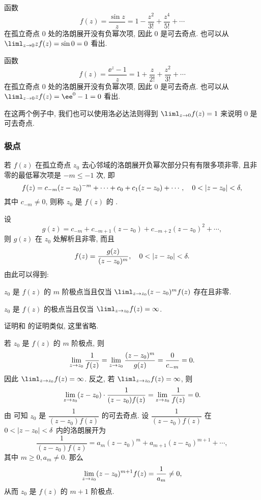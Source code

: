 \begin{exampleenum}
  \item 函数
  \[
    f(z)=\frac{\sin z}z=1-\dfrac{z^2}{3!}+\dfrac{z^4}{5!}+\cdots
  \]
  在孤立奇点 $0$ 处的洛朗展开没有负幂次项, 因此 $0$ 是可去奇点.
  也可以从 $\liml_{z\ra0}zf(z)=\sin 0=0$ 看出.
  \item 函数
  \[
    f(z)=\frac{\ee^z-1}z=1+\dfrac z{2!}+\dfrac{z^2}{3!}+\cdots
  \]
  在孤立奇点 $0$ 处的洛朗展开没有负幂次项, 因此 $0$ 是可去奇点.
  也可以从 $\liml_{z\ra0}zf(z)=\ee^0-1=0$ 看出.
\end{exampleenum}

在这两个例子中, 我们也可以使用洛必达法则得到 $\liml_{z\ra 0}f(z)=1$ 来说明 $0$ 是可去奇点.


\subsubsection{极点}

\begin{definition}
  若 $f(z)$ 在孤立奇点 $z_0$ 去心邻域的洛朗展开负幂次部分只有有限多项非零, 且非零的最低幂次项是 $-m\le-1$ 次, 即
  \[
    f(z)=c_{-m}(z-z_0)^{-m}+\cdots+c_0+c_1(z-z_0)+\cdots,\quad  0<\left|z-z_0\right|<\delta,
  \]
  其中 $c_{-m}\neq 0$, 则称 $z_0$ 是 $f(z)$ 的 .\footnotemark
\end{definition}

设
\[
  g(z)=c_{-m}+c_{-m+1}(z-z_0)+c_{-m+2}(z-z_0)^2+\cdots,
\]
则 $g(z)$ 在 $z_0$ 处解析且非零, 而且
\[
  f(z)=\dfrac{g(z)}{(z-z_0)^m},\quad 0<\left|z-z_0\right|<\delta.
\]
由此可以得到:

\begin{theorem}
  \label{thm:test-pole}
  \begin{enuma}
    \item $z_0$ 是 $f(z)$ 的 $m$ 阶极点当且仅当 $\liml_{z\ra z_0}(z-z_0)^mf(z)$ 存在且非零.
    \item $z_0$ 是 $f(z)$ 的极点当且仅当 $\liml_{z\ra z_0}f(z)=\infty$.
  \end{enuma}
\end{theorem}

\begin{proofenuma}
  \item 证明和 的证明类似, 这里省略.
  \item 若 $z_0$ 是 $f(z)$ 的 $m$ 阶极点, 则
  \[
      \lim_{z\rightarrow z_0}\frac1{f(z)}
    =\lim_{z\rightarrow z_0}\frac{(z-z_0)^m}{g(z)}
    =\frac{0}{c_{-m}}=0.
  \]
  因此 $\liml_{z\ra z_0}f(z)=\infty$.
  反之, 若 $\liml_{z\ra z_0}f(z)=\infty$, 则
  \[
      \lim_{z\rightarrow z_0}(z-z_0)\cdot\frac1{(z-z_0)f(z)}
    =\lim_{z\rightarrow z_0}\frac1{f(z)}=0.
  \]
  由 可知 $z_0$ 是 $\dfrac 1{(z-z_0)f(z)}$ 的可去奇点.
  设 $\dfrac 1{(z-z_0)f(z)}$ 在 $0<\left|z-z_0\right|<\delta$ 内的洛朗展开为
  \[
    \frac1{(z-z_0)f(z)}=a_m(z-z_0)^m+a_{m+1}(z-z_0)^{m+1}+\cdots,
  \]
  其中 $m\ge0,a_m\neq 0$.
  那么
  \[
    \lim_{z\rightarrow z_0}(z-z_0)^{m+1} f(z)=\frac1{a_m}\neq 0,
  \]
  从而 $z_0$ 是 $f(z)$ 的 $m+1$ 阶极点.\qedhere
\end{proofenuma}

